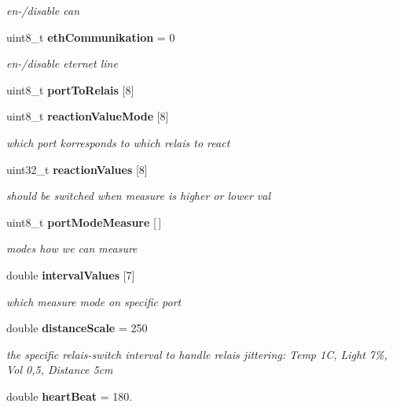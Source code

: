 \begin{DoxyCompactItemize}
\begin{DoxyCompactList}\small\item\em en-\//disable can \end{DoxyCompactList}\item 
uint8\-\_\-t {\bf eth\-Communikation} = 0\label{group__main_ga48cf4117469613426debd4f85c460808}

\begin{DoxyCompactList}\small\item\em en-\//disable eternet line \end{DoxyCompactList}\item 
uint8\-\_\-t {\bfseries port\-To\-Relais} [8]\label{group__main_ga57b981cfd8c3af7a1cdf90770f85aa8d}

\item 
uint8\-\_\-t {\bf reaction\-Value\-Mode} [8]\label{group__main_ga56c8fe85f8461ba0d291361c3a933870}

\begin{DoxyCompactList}\small\item\em which port korresponds to which relais to react \end{DoxyCompactList}\item 
uint32\-\_\-t {\bf reaction\-Values} [8]\label{group__main_ga8908e7ed7819607140342740d85e2b56}

\begin{DoxyCompactList}\small\item\em should be switched when measure is higher or lower val \end{DoxyCompactList}\item 
uint8\-\_\-t {\bf port\-Mode\-Measure} [$\,$]
\begin{DoxyCompactList}\small\item\em modes how we can measure \end{DoxyCompactList}\item 
double {\bf interval\-Values} [7]\label{group__main_gabf0863d719058ff6e45a37b5bcf04b48}

\begin{DoxyCompactList}\small\item\em which measure mode on specific port \end{DoxyCompactList}\item 
double {\bf distance\-Scale} = 250\label{group__main_gab3ee56c263833429c4f874777c7c8213}

\begin{DoxyCompactList}\small\item\em the specific relais-\/switch interval to handle relais jittering\-: \-Temp 1\-C, \-Light 7\%, \-Vol 0,5, \-Distance 5cm \end{DoxyCompactList}\item 
double {\bf heart\-Beat} = 180.\label{group__main_ga247b18b1a4a3625b0ff4f0792c8d1d3d}


\end{DoxyCompactItemize}

